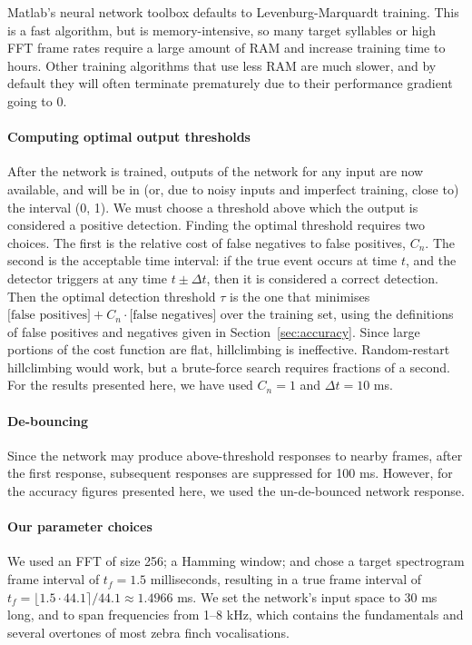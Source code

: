 \documentclass[10pt,letterpaper]{article}
\renewcommand{\subsubsection}[1]{\paragraph{#1}}
\begin{document}
Matlab's neural network toolbox defaults to Levenburg-Marquardt
training. This is a fast algorithm, but is memory-intensive, so
many target syllables or high FFT frame rates require a large
amount of RAM and increase training time to hours. Other training
algorithms that use less RAM are much slower, and by default they will
often terminate prematurely due to their performance gradient
going to 0.

\subsubsection{Computing optimal output thresholds}
\label{sec:optimalthresholds}
After the network is trained, outputs of the network for any input
are now available, and will be in (or, due to noisy inputs and imperfect training, close to) the
interval (0, 1). We must choose a threshold above which the output is
considered a positive detection. Finding the optimal threshold
requires two choices. The first is the relative cost of false
negatives to false positives, $C_n$. The second is the acceptable time
interval: if the true event occurs at time $t$, and the detector
triggers at any time $t\pm\Delta t$, then it is considered a correct
detection. Then the optimal detection threshold $\tau$ is the one that
minimises $\mbox{[false positives]} +C_n\cdot\mbox{[false negatives]}$
over the training set, using the definitions of false positives and
negatives given in Section~\ref{sec:accuracy}. Since large
portions of the cost function are flat, hillclimbing is ineffective.  Random-restart hillclimbing
would work, but a brute-force search requires fractions of a
second. For the results presented here, we have used $C_n=1$ and $\Delta t=10$ ms.

\subsubsection{De-bouncing}

Since the network may produce above-threshold responses to nearby frames, after the first response, subsequent responses are suppressed for 100 ms.  However, for the accuracy figures presented here, we used the un-de-bounced network response.

\subsubsection{Our parameter choices}

We used an FFT of size 256; a Hamming window; and chose a target spectrogram
frame interval of $t_f=1.5$ milliseconds, resulting in a true frame interval of $t_f=\lfloor 1.5\cdot 44.1\rceil /44.1\approx 1.4966$ ms.  We set the network's input
space to 30 ms long, and to span frequencies from 1--8 kHz, which
contains the fundamentals and several overtones of most zebra finch
vocalisations.
\end{document}
